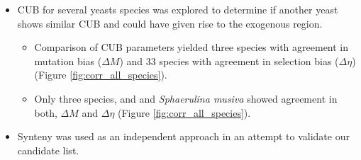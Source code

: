 \documentclass[12pt]{article}
\begin{document}
\begin{itemize}
\begin{itemize}
	\end{itemize}
	\item CUB for several yeasts species was explored to determine if another yeast shows similar CUB and could have given rise to the exogenous region.
	\begin{itemize}
		\item Comparison of CUB parameters yielded three species with agreement in mutation bias ($\Delta M$) and $33$ species with agreement in selection bias ($\Delta \eta$) (Figure \ref{fig:corr_all_species}).
		\item Only three species, \gossypii and \dubl and \textit{Sphaerulina musiva} showed agreement in both, $\Delta M$ and $\Delta \eta$ (Figure \ref{fig:corr_all_species}).
	\end{itemize}
	\item Synteny was used as an independent approach in an attempt to validate our candidate list.

\end{itemize}
\end{document}
